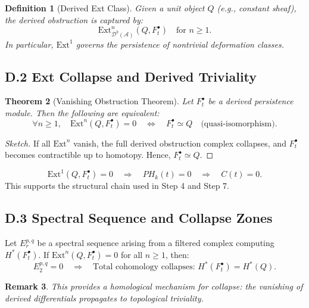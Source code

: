 \documentclass[11pt]{article}
\newtheorem{theorem}{Theorem}[section]
\newtheorem{definition}[theorem]{Definition}
\newtheorem{remark}[theorem]{Remark}
\begin{document}
\begin{definition}[Derived Ext Class]
Given a unit object $Q$ (e.g., constant sheaf), the derived obstruction is captured by:
\[
\mathrm{Ext}^n_{\mathcal{D}^b(\mathcal{A})}(Q, F^\bullet_t) \quad \text{for } n \geq 1.
\]
In particular, $\mathrm{Ext}^1$ governs the persistence of nontrivial deformation classes.
\end{definition}

\subsection*{D.2 Ext Collapse and Derived Triviality}

\begin{theorem}[Vanishing Obstruction Theorem]
Let $F^\bullet_t$ be a derived persistence module. Then the following are equivalent:
\[
\forall n \geq 1,\quad \mathrm{Ext}^n(Q, F^\bullet_t) = 0
\quad \Longleftrightarrow \quad
F^\bullet_t \simeq Q \quad \text{(quasi-isomorphism)}.
\]
\end{theorem}

\begin{proof}[Sketch]
If all $\mathrm{Ext}^n$ vanish, the full derived obstruction complex collapses, and $F^\bullet_t$ becomes contractible up to homotopy. Hence, $F^\bullet_t \simeq Q$.
\end{proof}

\begin{corollary}
\[
\mathrm{Ext}^1(Q, F^\bullet_t) = 0 \quad \Rightarrow \quad PH_k(t) = 0 \quad \Rightarrow \quad C(t) = 0.
\]
This supports the structural chain used in Step 4 and Step 7.
\end{corollary}

\subsection*{D.3 Spectral Sequence and Collapse Zones}

\begin{lemma}
Let $E_r^{p,q}$ be a spectral sequence arising from a filtered complex computing $H^*(F^\bullet_t)$.  
If $\mathrm{Ext}^n(Q, F^\bullet_t) = 0$ for all $n \geq 1$, then:
\[
E_2^{p,q} = 0 \quad \Rightarrow \quad \text{Total cohomology collapses: } H^*(F^\bullet_t) = H^*(Q).
\]
\end{lemma}

\begin{remark}
This provides a homological mechanism for collapse: the vanishing of derived differentials propagates to topological triviality.
\end{remark}
\end{document}
